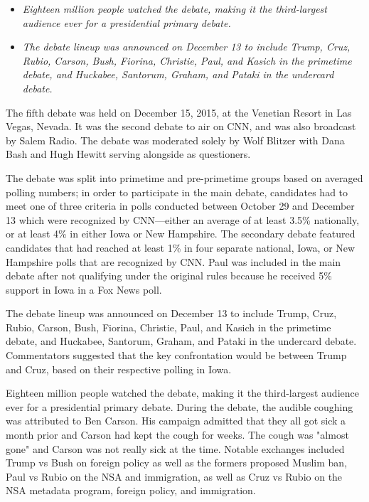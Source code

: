 \begin{itemize}
\item
  \emph{Eighteen million people watched the debate, making it the
  third-largest audience ever for a presidential primary debate.}
\item
  \emph{The debate lineup was announced on December 13 to include Trump,
  Cruz, Rubio, Carson, Bush, Fiorina, Christie, Paul, and Kasich in the
  primetime debate, and Huckabee, Santorum, Graham, and Pataki in the
  undercard debate.}
\end{itemize}

The fifth debate was held on December 15, 2015, at the Venetian Resort
in Las Vegas, Nevada. It was the second debate to air on CNN, and was
also broadcast by Salem Radio. The debate was moderated solely by Wolf
Blitzer with Dana Bash and Hugh Hewitt serving alongside as questioners.

The debate was split into primetime and pre-primetime groups based on
averaged polling numbers; in order to participate in the main debate,
candidates had to meet one of three criteria in polls conducted between
October 29 and December 13 which were recognized by CNN---either an
average of at least 3.5\% nationally, or at least 4\% in either Iowa or
New Hampshire. The secondary debate featured candidates that had reached
at least 1\% in four separate national, Iowa, or New Hampshire polls
that are recognized by CNN. Paul was included in the main debate after
not qualifying under the original rules because he received 5\% support
in Iowa in a Fox News poll.

The debate lineup was announced on December 13 to include Trump, Cruz,
Rubio, Carson, Bush, Fiorina, Christie, Paul, and Kasich in the
primetime debate, and Huckabee, Santorum, Graham, and Pataki in the
undercard debate. Commentators suggested that the key confrontation
would be between Trump and Cruz, based on their respective polling in
Iowa.

Eighteen million people watched the debate, making it the third-largest
audience ever for a presidential primary debate. During the debate, the
audible coughing was attributed to Ben Carson. His campaign admitted
that they all got sick a month prior and Carson had kept the cough for
weeks. The cough was "almost gone" and Carson was not really sick at the
time. Notable exchanges included Trump vs Bush on foreign policy as well
as the formers proposed Muslim ban, Paul vs Rubio on the NSA and
immigration, as well as Cruz vs Rubio on the NSA metadata program,
foreign policy, and immigration.

